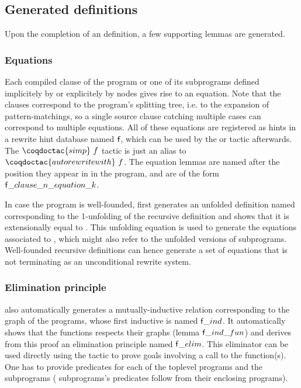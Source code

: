\subsection{Generated definitions}

Upon the completion of an \Equations definition, a few supporting lemmas
are generated.

\subsubsection{Equations}

Each compiled clause of the program or one
of its subprograms defined implicitely by  or explicitely by
 nodes gives rise to an equation. Note that the clauses
correspond to the program's splitting tree, i.e. to the expansion of
pattern-matchings, so a single source clause catching multiple cases
can correspond to multiple equations. All of these equations are
registered as hints in a rewrite hint database named $\mbox{\textsf{f}}$, which can be
used by the  or  tactic
afterwards. The $\coqdoctac{simp}~f$ tactic is just an alias to
$\coqdoctac{autorewrite with}~f$. The equation lemmas are named
after the position they appear in in the program, and are of the
form $\mbox{\textsf{f}}\_clause\_n\_equation\_k$.

In case the program is well-founded, \Equations first generates an
unfolded definition named  corresponding to the
1-unfolding of the recursive definition and shows that it is
extensionally equal to . This unfolding equation is used
to generate the equations associated to , which might also
refer to the unfolded versions of subprograms. Well-founded
recursive definitions can hence generate a set of equations that
is not terminating as an unconditional rewrite system.

\subsubsection{Elimination principle}

\Equations also automatically generates a mutually-inductive relation
corresponding to the graph of the programs, whose first inductive is named
$\mbox{\textsf{f}}\_ind$. It automatically shows that the functions respects their
graphs (lemma $\mbox{\textsf{f}}\_ind\_fun$) and derives from this proof an
elimination principle named $\mbox{\textsf{f}}\_elim$. This eliminator can be used
directly using the  tactic to prove goals involving a call to
the function(s). One has to provide predicates for each of the toplevel
programs and the  subprograms ( subprograms's
predicates follow from their enclosing programs).


